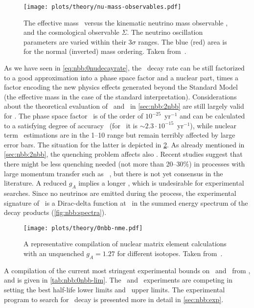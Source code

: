 \begin{figure}
  \centering
  \texttt{[image: plots/theory/nu-mass-observables.pdf]}
  \caption{%
    The effective mass \mbb\ versus the kinematic neutrino mass observable
    \mb, and the cosmological observable $\Sigma$. The neutrino
    oscillation parameters are varied within their $3\sigma$ ranges. The blue
    (red) area is for the normal (inverted) mass ordering. Taken
    from~\cite{Dolinski2019}.
  }\label{fig:nbb:mass-obs}
\end{figure}

As we have seen in \cref{eq:nbb:0nudecayrate}, the \onbb\ decay rate can be still
factorized to a good approximation into a phase space factor and a nuclear part, times a
factor encoding the new physics effects generated beyond the Standard Model (the effective
mass in the case of the standard interpretation). Considerations about the theoretical
evaluation of \psft\ and \nmet\ in \cref{sec:nbb:2nbb} are still largely valid for \onbb.
The phase space factor \psfz\ is of the order of $10^{-25}$~yr$^{-1}$ and can be
calculated to a satisfying degree of accuracy~\cite{Kotila2012, Stoica2013} (for \gesix\
it is ${\sim}2.3 \cdot 10^{-15}$~yr$^{-1}$), while nuclear term \nmez\ estimations are in
the 1--10 range but remain terribly affected by large error bars. The situation for the
latter is depicted in \cref{fig:nbb:nme}. As already mentioned in \cref{sec:nbb:2nbb}, the
quenching problem affects also \onbb. Recent studies suggest that there might be less
quenching needed (not more than 20--30\%) in processes with large momentum transfer such
as \onbb~\cite{?}, but there is not yet consensus in the literature. A reduced $g_A$
implies a longer \thalfzero, which is undesirable for experimental searches.  Since no
neutrinos are emitted during the process, the experimental signature of \onbb\ is a
Dirac-delta function at \qbb\ in the summed energy spectrum of the decay products
(\cref{fig:nbb:spectra}).

\begin{figure}
  \centering
  \texttt{[image: plots/theory/0nbb-nme.pdf]}
  \caption{%
    A representative compilation of nuclear matrix element calculations with an unquenched
    $g_A=1.27$ for different isotopes. Taken from~\cite{Yao2020}.
  }\label{fig:nbb:nme}
\end{figure}

A compilation of the current most stringent experimental bounds on \thalfzero\ and \mbb\
from \gesix,  and  is given in \cref{tab:nbb:0nbb-lim}. The \gerda\
and \kamlandzen\ experiments are competing in setting the best half-life lower limits and
\mbb\ upper limits. The experimental program to search for \onbb\ decay is presented more
in detail in \cref{sec:nbb:exp}.

